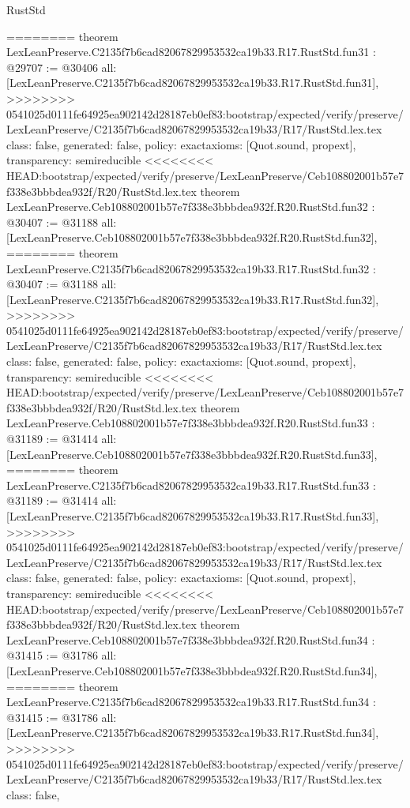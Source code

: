 \begin{lexlean}{RustStd}
\begin{coremodule}
{\begin{coremodule}
{{{{{{{{{{{{{{{{{{{{{{{{{{{{{{{{{{========
theorem LexLeanPreserve.C2135f7b6cad82067829953532ca19b33.R17.RustStd.fun31 : @29707 := @30406 {
  all: [LexLeanPreserve.C2135f7b6cad82067829953532ca19b33.R17.RustStd.fun31],
>>>>>>>> 0541025d0111fe64925ea902142d28187eb0ef83:bootstrap/expected/verify/preserve/LexLeanPreserve/C2135f7b6cad82067829953532ca19b33/R17/RustStd.lex.tex
  class: false,
  generated: false,
  policy: exact{axioms: [Quot.sound, propext]},
  transparency: semireducible
}
<<<<<<<< HEAD:bootstrap/expected/verify/preserve/LexLeanPreserve/Ceb108802001b57e7f338e3bbbdea932f/R20/RustStd.lex.tex
theorem LexLeanPreserve.Ceb108802001b57e7f338e3bbbdea932f.R20.RustStd.fun32 : @30407 := @31188 {
  all: [LexLeanPreserve.Ceb108802001b57e7f338e3bbbdea932f.R20.RustStd.fun32],
========
theorem LexLeanPreserve.C2135f7b6cad82067829953532ca19b33.R17.RustStd.fun32 : @30407 := @31188 {
  all: [LexLeanPreserve.C2135f7b6cad82067829953532ca19b33.R17.RustStd.fun32],
>>>>>>>> 0541025d0111fe64925ea902142d28187eb0ef83:bootstrap/expected/verify/preserve/LexLeanPreserve/C2135f7b6cad82067829953532ca19b33/R17/RustStd.lex.tex
  class: false,
  generated: false,
  policy: exact{axioms: [Quot.sound, propext]},
  transparency: semireducible
}
<<<<<<<< HEAD:bootstrap/expected/verify/preserve/LexLeanPreserve/Ceb108802001b57e7f338e3bbbdea932f/R20/RustStd.lex.tex
theorem LexLeanPreserve.Ceb108802001b57e7f338e3bbbdea932f.R20.RustStd.fun33 : @31189 := @31414 {
  all: [LexLeanPreserve.Ceb108802001b57e7f338e3bbbdea932f.R20.RustStd.fun33],
========
theorem LexLeanPreserve.C2135f7b6cad82067829953532ca19b33.R17.RustStd.fun33 : @31189 := @31414 {
  all: [LexLeanPreserve.C2135f7b6cad82067829953532ca19b33.R17.RustStd.fun33],
>>>>>>>> 0541025d0111fe64925ea902142d28187eb0ef83:bootstrap/expected/verify/preserve/LexLeanPreserve/C2135f7b6cad82067829953532ca19b33/R17/RustStd.lex.tex
  class: false,
  generated: false,
  policy: exact{axioms: [Quot.sound, propext]},
  transparency: semireducible
}
<<<<<<<< HEAD:bootstrap/expected/verify/preserve/LexLeanPreserve/Ceb108802001b57e7f338e3bbbdea932f/R20/RustStd.lex.tex
theorem LexLeanPreserve.Ceb108802001b57e7f338e3bbbdea932f.R20.RustStd.fun34 : @31415 := @31786 {
  all: [LexLeanPreserve.Ceb108802001b57e7f338e3bbbdea932f.R20.RustStd.fun34],
========
theorem LexLeanPreserve.C2135f7b6cad82067829953532ca19b33.R17.RustStd.fun34 : @31415 := @31786 {
  all: [LexLeanPreserve.C2135f7b6cad82067829953532ca19b33.R17.RustStd.fun34],
>>>>>>>> 0541025d0111fe64925ea902142d28187eb0ef83:bootstrap/expected/verify/preserve/LexLeanPreserve/C2135f7b6cad82067829953532ca19b33/R17/RustStd.lex.tex
  class: false,
}}}}}}}}}}}}}}}}}}}}}}}}}}}}}}}}}}}}}}
\end{coremodule}}
\end{coremodule}
\end{lexlean}
